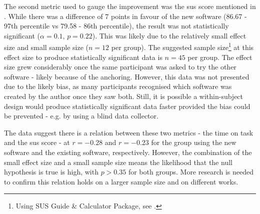 {The second metric used to gauge the improvement was the \gls{sus} score mentioned in .
While there was a difference of 7 points in favour of the new software (86.67 - 97th percentile vs 79.58 - 86th percentile), the result was not statistically significant ($\alpha=0.1$, $p=0.22$).
This was likely due to the relatively small effect size and small sample size ($n=12$ per group).
The suggested sample size\footnote{Using SUS Guide \& Calculator Package, see .} at this effect size to produce statistically significant data is $n=45$ per group.
The effect size grew considerably once the same participant was asked to try the other software - likely because of the anchoring.
However, this data was not presented due to the likely bias, as many participants recognised which software was created by the author once they saw both.
Still, it is possible a within-subject design would produce statistically significant data faster provided the bias could be prevented - e.g. by using a blind data collector.

The data suggest there is a relation between these two metrics - the time on task and the \gls{sus} score - at $r=-0.28$ and $r=-0.23$ for the group using the new software and the existing software, respectively.
However, the combination of the small effect size and a small sample size means the likelihood that the null hypothesis is true is high, with $p > 0.35$ for both groups.
More research is needed to confirm this relation holds on a larger sample size and on different works.

}
